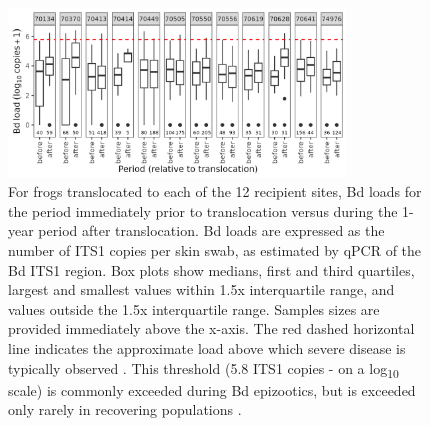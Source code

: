 \documentclass[9pt,twoside,lineno]{pnas-new-SI}
\begin{document}
\begin{figure}

{\centering \includegraphics[width=0.80\textwidth]{figures/bdload_beforeafter.png}

}

\caption{\label{fig-bdload-beforeafter}For frogs translocated to each of
the 12 recipient sites, Bd loads for the period immediately prior to
translocation versus during the 1-year period after translocation. Bd
loads are expressed as the number of ITS1 copies per skin swab, as
estimated by qPCR of the Bd ITS1 region. Box plots show medians, first
and third quartiles, largest and smallest values within 1.5x
interquartile range, and values outside the 1.5x interquartile range.
Samples sizes are provided immediately above the x-axis. The red dashed
horizontal line indicates the approximate load above which severe
disease is typically observed \citep{vredenburg2010}. This threshold
(5.8 ITS1 copies - on a log\textsubscript{10} scale) is commonly
exceeded during Bd epizootics, but is exceeded only rarely in recovering
populations \citep{briggs2010}.}

\end{figure}\clearpage

\newpage
\end{document}
